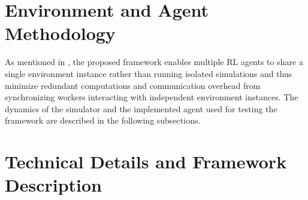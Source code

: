\section{Environment and Agent Methodology}
\label{sec:methodology}

As mentioned in , the proposed framework enables multiple RL agents
to share a single environment instance rather than running isolated simulations and thus
minimize redundant computations and communication overhead from synchronizing workers interacting with independent environment instances.
The dynamics of the simulator and the implemented agent used for testing the framework are described in the following subsections.




\section{Technical Details and Framework Description}
\label{sec:technical_details}



